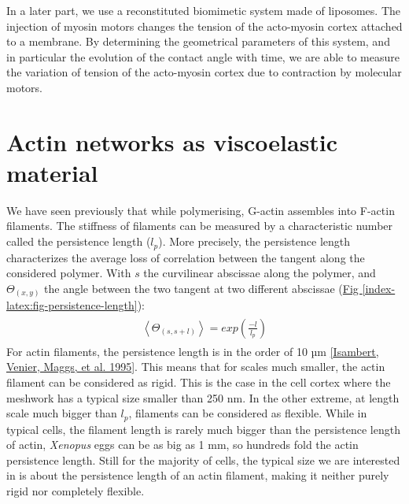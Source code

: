 \documentclass[A4paperpaper,11pt,english]{sphinxmanual}
\begin{document}
In a later part, we use a reconstituted biomimetic system made of liposomes. The
injection of myosin motors changes the tension of the acto-myosin cortex
attached to a membrane. By determining the geometrical parameters of this
system, and in particular the evolution of the contact angle with time, we are
able to measure the variation of tension of the acto-myosin cortex due to contraction by
molecular motors.


\section{Actin networks as viscoelastic material}
\label{index-latex:viscoelastic}\label{index-latex:actin-networks-as-viscoelastic-material}
We have seen previously that while polymerising, G-actin assembles into F-actin
filaments. The stiffness of filaments can be measured by a characteristic number
called the persistence length (\(l_p\)). More precisely, the
persistence length characterizes the average loss of correlation between the
tangent along the considered polymer. With \(s\) the curvilinear abscissae along the polymer,
and \(\Theta_{(x,y)}\) the angle between the two tangent at two different abscissae (\hyperref[index-latex:fig-persistence-length]{Fig  \ref*{index-latex:fig-persistence-length}}):
\label{index-latex:equation-eqa6}\begin{gather}
\begin{split}\left<\Theta_{(s,s+l)}\right> = exp\left(\frac{-l}{l_p}\right)\end{split}\label{index-latex-eqa6}
\end{gather}
For actin filaments, the
persistence length is in the order of 10 µm {\hyperref[index-latex:isambert1995]{{[}Isambert, Venier, Maggs,  et al.  1995{]}}}. This means
that for scales much smaller, the actin filament can be considered as rigid.
This is the case in the cell cortex where the meshwork has a typical size smaller than 250 nm. In
the other extreme, at length scale much bigger than \(l_p\), filaments can
be considered as flexible. While in typical cells, the filament length is
rarely much bigger than the persistence length of actin, \emph{Xenopus} eggs can be
as big as 1 mm, so hundreds fold the actin persistence length.
Still for the majority of cells, the typical size we are interested in
is about the persistence length of an actin filament, making it neither purely
rigid nor completely flexible.
\end{document}
